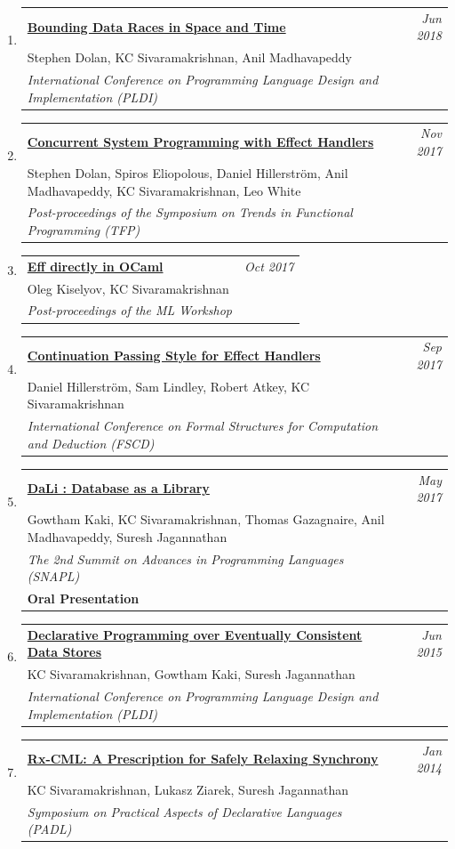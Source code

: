 \documentclass[10pt]{article}
\makeatletter
\newcommand{\lbar}[1]{{\color{#1}\ding{118}}\hspace*{2pt}}
\newenvironment{benumerate}[2]{
    \let\oldItem\item
    \def\item{\addtocounter{enumi}{-2}\oldItem}
    \begin{enumerate}[#2] \itemsep3pt
    \setcounter{enumi}{#1}
    \addtocounter{enumi}{1}}
  {\end{enumerate}}
\newenvironment{publication}[5]
{ \item
  \begin{tabular*}{7.5in}{p{6.3in}@{\extracolsep{\fill}}r}
    \href{#1}{\textbf{#2}} & \textit{#3}\\ #4 &\\ \textit{#5}&\\
  \end{tabular*}
} {}
\newenvironment{publicationNote}[6]
{ \item
  \begin{tabular*}{7.5in}{p{6.3in}@{\extracolsep{\fill}}r}
    \href{#1}{\textbf{#2}} & \textit{#3}\\ #4 &\\ \textit{#5}\\ \textbf{#6} \\
  \end{tabular*}
} {}
\newenvironment{region}[3]{%
  \Needspace{7\baselineskip}
  \vspace*{0.5ex}
  {\scalebox{1.4}{\textbf{#1}}}
  \begin{benumerate}{#3}{\color{RoyalBlue}#2}}
  {\end{benumerate}\vspace{0.8ex}}
\makeatother
\begin{document}
\begin{region} {\lbar{purple}Conference Publications}{{C}1}{18}
	\begin{publication} {http://kcsrk.info/papers/pldi18-memory.pdf}
		{Bounding Data Races in Space and Time}
		{Jun 2018} {Stephen Dolan, KC Sivaramakrishnan, Anil Madhavapeddy}
		{International Conference on Programming Language Design and Implementation (PLDI)}
  \end{publication}

  \begin{publication}{http://kcsrk.info/papers/system_effects_feb_18.pdf}
    {Concurrent System Programming with Effect Handlers}
    {Nov 2017}{Stephen Dolan, Spiros Eliopolous, Daniel Hillerström, Anil Madhavapeddy, KC Sivaramakrishnan, Leo White}
    {Post-proceedings of the Symposium on Trends in Functional Programming (TFP)}
  \end{publication}

  \begin{publication}{http://kcsrk.info/papers/caml-eff17.pdf}
    {Eff directly in OCaml}
    {Oct 2017}{Oleg Kiselyov, KC Sivaramakrishnan}
    {Post-proceedings of the ML Workshop}
  \end{publication}

  \begin{publication} {http://kcsrk.info/papers/cps-handler-fscd17.pdf}
    {Continuation Passing Style for Effect Handlers}
    {Sep 2017} {Daniel Hillerström, Sam Lindley, Robert Atkey, KC Sivaramakrishnan}
    {International Conference on Formal Structures for Computation and Deduction (FSCD)}
  \end{publication}

  \begin{publicationNote} {http://kcsrk.info/papers/dali_snapl17.pdf}
    {DaLi : Database as a Library}
    {May 2017} {Gowtham Kaki, KC Sivaramakrishnan, Thomas Gazagnaire, Anil Madhavapeddy, Suresh Jagannathan}
    {The 2nd Summit on Advances in Programming Languages (SNAPL)}
    {Oral Presentation}
  \end{publicationNote}

  \begin{publication} {http://kcsrk.info/papers/quelea_pldi15.pdf}
    {Declarative Programming over Eventually Consistent Data Stores}
    {Jun 2015} {KC Sivaramakrishnan, Gowtham Kaki, Suresh Jagannathan}
    {International Conference on Programming Language Design and Implementation (PLDI)}
  \end{publication}

  \begin{publication}{http://kcsrk.info/papers/rxcml_padl14.pdf}
    {Rx-CML: A Prescription for Safely Relaxing Synchrony}
    {Jan 2014}{KC Sivaramakrishnan, Lukasz Ziarek, Suresh Jagannathan}
    {Symposium on Practical Aspects of Declarative Languages (PADL)}
  \end{publication}


\end{region}
\end{document}
